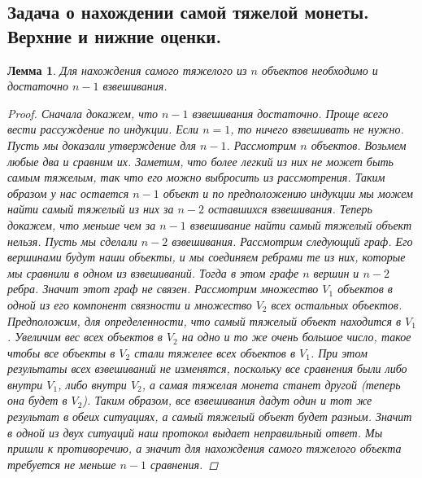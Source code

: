 \documentclass{article}
\newtheorem{lemma}{Лемма}
\begin{document}
\subsection{Задача о нахождении самой тяжелой монеты. Верхние и нижние оценки.}
\begin{lemma}
Для нахождения самого тяжелого из $n$ объектов необходимо и достаточно $n - 1$ взвешивания.
\begin{proof}
Сначала докажем, что $n-1$ взвешивания достаточно. Проще всего вести рассуждение по индукции. Если $n = 1$, то ничего взвешивать не нужно. Пусть мы доказали утверждение для $n - 1$. Рассмотрим $n$ объектов. Возьмем любые два и сравним их. Заметим, что более легкий из них не может быть самым тяжелым, так что его можно выбросить из рассмотрения. Таким образом у нас остается $n - 1$ объект и по предположению индукции мы можем найти самый тяжелый из них за $n - 2$ оставшихся взвешивания.
\newline
Теперь докажем, что меньше чем за $n - 1$ взвешивание найти самый тяжелый объект нельзя. Пусть мы сделали $n - 2$ взвешивания. Рассмотрим следующий граф. Его вершинами будут наши объекты, и мы соединяем ребрами те из них, которые мы сравнили в одном из взвешиваний. Тогда в этом графе $n$ вершин и $n - 2$ ребра. Значит этот граф не связен. Рассмотрим множество $V_1$ объектов в одной из его компонент связности и множество $V_2$ всех остальных объектов. Предположим, для определенности, что самый тяжелый объект находится в $V_1$. Увеличим вес всех объектов в $V_2$ на одно и то же очень большое число, такое чтобы все объекты в $V_2$ стали тяжелее всех объектов в $V_1$. При этом результаты всех взвешиваний не изменятся, поскольку все сравнения были либо внутри $V_1$, либо внутри $V_2$, а самая тяжелая монета станет другой (теперь она будет в $V_2$). Таким образом, все взвешивания дадут один и тот же результат в обеих ситуациях, а самый тяжелый объект будет разным. Значит в одной из двух ситуаций наш протокол выдает неправильный ответ. Мы пришли к противоречию, а значит для нахождения самого тяжелого объекта требуется не меньше $n-1$ сравнения.


\end{proof}
\end{lemma}
\end{document}
